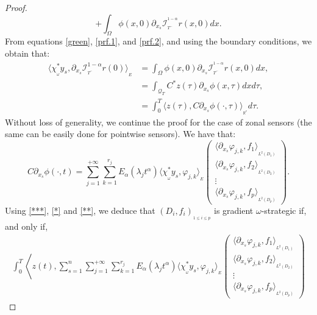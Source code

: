 \documentclass{article}
\begin{document}
\begin{proof}
\begin{equation}
+ \int_{\Omega}\phi(x,0)\partial_{x_s}
\mathcal{I}_{_{T^-}}^{^{1-\alpha}}r(x,0)dx.
\end{equation}
From equations \eqref{green}, \eqref{prf.1}, and \eqref{prf.2}, 
and using the boundary conditions, we obtain that:
\begin{equation}
\label{*}
\begin{split}
\langle \chi_{_\omega}^*y_s,\partial_{x_s}
\mathcal{I}^{1-\alpha}_{_{T^-}}r(0) \rangle_{_{E}}	
&= \int_{\Omega}\phi(x,0)\partial_{x_s}
\mathcal{I}_{_{T^-}}^{^{1-\alpha}}r(x,0)dx,\\
&= \int_{\mathcal{Q}_T} C^*z(\tau)\partial_{x_s} \phi(x,\tau)dxd\tau,\\
&= \int_{0}^{T}\langle z(\tau),C\partial_{x_s} 
\phi(\cdot,\tau)\rangle_{_{\mathbb{R}^{^p}}}d\tau.
\end{split}
\end{equation}
Without loss of generality, we continue the proof for the case of zonal 
sensors (the same can be easily done for pointwise sensors). We have that: 
\begin{equation}
\label{**}
C\partial_{x_s} \phi(\cdot,t) 
= \displaystyle\sum_{j=1}^{+\infty}
\sum_{k=1}^{r_j}E_\alpha(\lambda_jt^\alpha)\langle \chi_{_\omega}^*y_s,
\varphi_{j,k}\rangle_{_{E}}\left(
\begin{array}{c}
\langle \partial_{x_s} \varphi_{j,k},f_1\rangle_{_{L^2(D_1)}}\\
\langle \partial_{x_s} \varphi_{j,k},f_2\rangle_{_{L^2(D_2)}}\\ 
\vdots \\
\langle \partial_{x_s} \varphi_{j,k},f_p\rangle_{_{L^2(D_p)}}
\end{array}\right).
\end{equation}
Using \eqref{***}, \eqref{*} and \eqref{**}, we deduce that 
$(D_i,f_i)_{_{1\leq i\leq p}}$ is gradient 
$\omega$-strategic if, and only if,
\begin{multline*}
\displaystyle\int_{0}^{T}\left\langle z(t) , 
\displaystyle\sum_{s=1}^{n}\sum_{j=1}^{+\infty}\sum_{k=1}^{r_j}
E_\alpha(\lambda_jt^\alpha)  \langle \chi_{_\omega}^*y_s,
\varphi_{j,k}\rangle_{_{E}}\left(
\begin{array}{c}
\langle \partial_{x_s} \varphi_{j,k},f_1\rangle_{_{L^2(D_1)}}\\
\langle \partial_{x_s} \varphi_{j,k},f_2\rangle_{_{L^2(D_2)}}\\ 
\vdots \\
\langle \partial_{x_s} \varphi_{j,k},f_p\rangle_{_{L^2(D_p)}}
\end{array}\right)

\end{multline*}
\end{proof}
\end{document}
